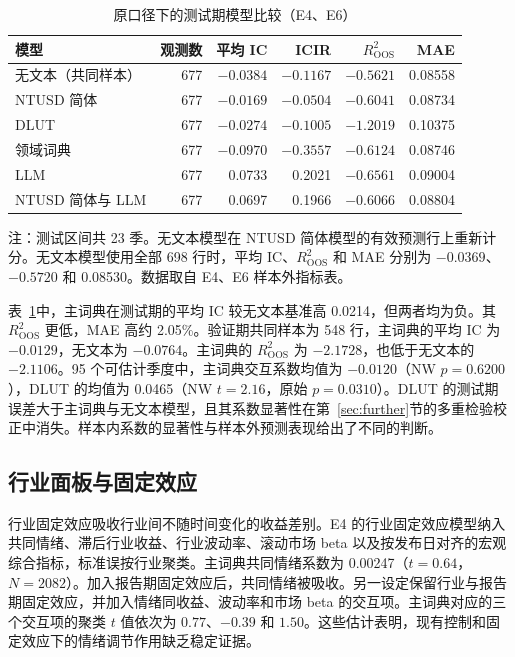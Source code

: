 \begin{table}[htbp]
  \centering\small
  \caption{原口径下的测试期模型比较（E4、E6）}\label{tab:model-oos}
  \begin{tabular}{lrrrrr}
    \toprule
    模型 & 观测数 & 平均 IC & ICIR & $R^2_{\mathrm{OOS}}$ & MAE \\
    \midrule
    无文本（共同样本） & 677 & $-0.0384$ & $-0.1167$ & $-0.5621$ & 0.08558 \\
    NTUSD 简体 & 677 & $-0.0169$ & $-0.0504$ & $-0.6041$ & 0.08734 \\
    DLUT & 677 & $-0.0274$ & $-0.1005$ & $-1.2019$ & 0.10375 \\
    领域词典 & 677 & $-0.0970$ & $-0.3557$ & $-0.6124$ & 0.08746 \\
    LLM & 677 & 0.0733 & 0.2021 & $-0.6561$ & 0.09004 \\
    NTUSD 简体与 LLM & 677 & 0.0697 & 0.1966 & $-0.6066$ & 0.08804 \\
    \bottomrule
  \end{tabular}
  \par\smallskip
  \parbox{0.9\linewidth}{\footnotesize 注：测试区间共 23 季。无文本模型在 NTUSD 简体模型的有效预测行上重新计分。无文本模型使用全部 698 行时，平均 IC、$R^2_{\mathrm{OOS}}$ 和 MAE 分别为 $-0.0369$、$-0.5720$ 和 0.08530。数据取自 E4、E6 样本外指标表。}
\end{table}

表~\ref{tab:model-oos}中，主词典在测试期的平均 IC 较无文本基准高 0.0214，但两者均为负。其 $R^2_{\mathrm{OOS}}$ 更低，MAE 高约 2.05\%。验证期共同样本为 548 行，主词典的平均 IC 为 $-0.0129$，无文本为 $-0.0764$。主词典的 $R^2_{\mathrm{OOS}}$ 为 $-2.1728$，也低于无文本的 $-2.1106$。95 个可估计季度中，主词典交互系数均值为 $-0.0120$（NW $p=0.6200$），DLUT 的均值为 0.0465（NW $t=2.16$，原始 $p=0.0310$）。DLUT 的测试期误差大于主词典与无文本模型，且其系数显著性在第~\ref{sec:further}节的多重检验校正中消失。样本内系数的显著性与样本外预测表现给出了不同的判断。

\subsection{行业面板与固定效应}

行业固定效应吸收行业间不随时间变化的收益差别。E4 的行业固定效应模型纳入共同情绪、滞后行业收益、行业波动率、滚动市场 beta 以及按发布日对齐的宏观综合指标，标准误按行业聚类。主词典共同情绪系数为 0.00247（$t=0.64$，$N=2082$）。加入报告期固定效应后，共同情绪被吸收。另一设定保留行业与报告期固定效应，并加入情绪同收益、波动率和市场 beta 的交互项。主词典对应的三个交互项的聚类 $t$ 值依次为 $0.77$、$-0.39$ 和 $1.50$。这些估计表明，现有控制和固定效应下的情绪调节作用缺乏稳定证据。

